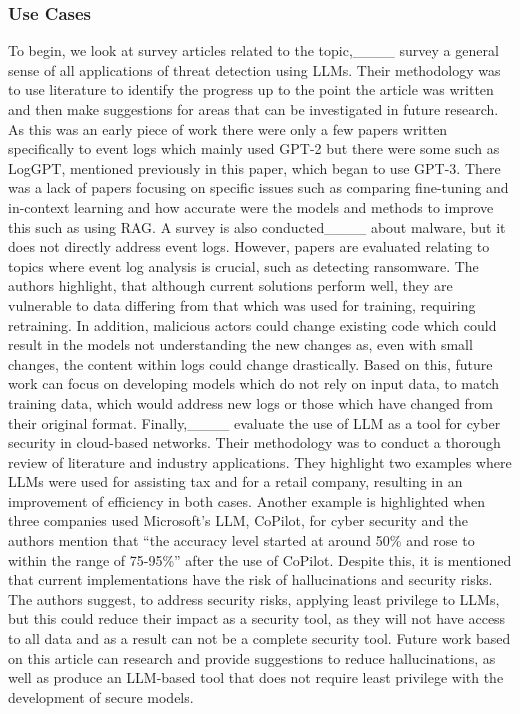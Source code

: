 \subsubsection{Use Cases}
To begin, we look at survey articles related to the topic,____ survey a general sense of all applications of threat detection using LLMs. Their methodology was to use literature to identify the progress up to the point the article was written and then make suggestions for areas that can be investigated in future research. As this was an early piece of work there were only a few papers written specifically to event logs which mainly used GPT-2 but there were some such as LogGPT, mentioned previously in this paper, which began to use GPT-3. There was a lack of papers focusing on specific issues such as comparing fine-tuning and in-context learning and how accurate were the models and methods to improve this such as using RAG. A survey is also conducted____ about malware, but it does not directly address event logs. However, papers are evaluated relating to topics where event log analysis is crucial, such as detecting ransomware. The authors highlight, that although current solutions perform well, they are vulnerable to data differing from that which was used for training, requiring retraining. In addition, malicious actors could change existing code which could result in the models not understanding the new changes as, even with small changes, the content within logs could change drastically. Based on this, future work can focus on developing models which do not rely on input data, to match training data, which would address new logs or those which have changed from their original format. Finally,____ evaluate the use of LLM as a tool for cyber security in cloud-based networks. Their methodology was to conduct a thorough review of literature and industry applications. They highlight two examples where LLMs were used for assisting tax and for a retail company, resulting in an improvement of efficiency in both cases. Another example is highlighted when three companies used Microsoft's LLM, CoPilot, for cyber security and the authors mention that ``the accuracy level started at around 50\% and rose to within the range of 75-95\%'' after the use of CoPilot. Despite this, it is mentioned that current implementations have the risk of hallucinations and security risks. The authors suggest, to address security risks, applying least privilege to LLMs, but this could reduce their impact as a security tool, as they will not have access to all data and as a result can not be a complete security tool. Future work based on this article can research and provide suggestions to reduce hallucinations, as well as produce an LLM-based tool that does not require least privilege with the development of secure models.

